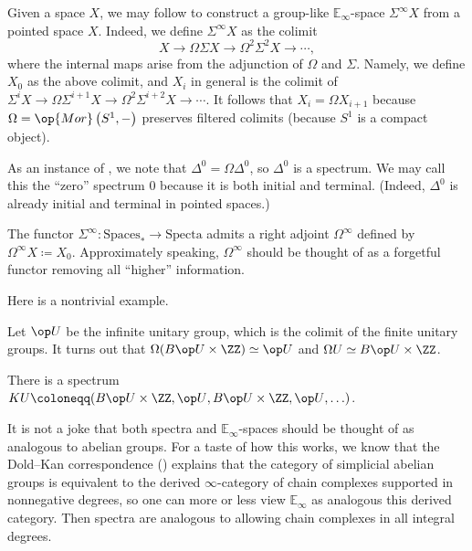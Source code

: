 \documentclass[../notes.tex]{subfiles}
\begin{document}
\begin{example} \label{ex:space-to-spec}
	Given a space $X$, we may follow  to construct a group-like $\mathbb E_\infty$-space $\Sigma^\infty X$ from a pointed space $X$. Indeed, we define $\Sigma^\infty X$ as the colimit
	\[X\to\Omega\Sigma X\to\Omega^2\Sigma^2X\to\cdots,\]
	where the internal maps arise from the adjunction of $\Omega$ and $\Sigma$. Namely, we define $X_0$ as the above colimit, and $X_i$ in general is the colimit of $\Sigma^iX\to\Omega\Sigma^{i+1}X\to\Omega^2\Sigma^{i+2}X\to\cdots$. It follows that $X_i=\Omega X_{i+1}$ because $\Omega=\op{Mor}\left(S^1,-\right)$ preserves filtered colimits (because $S^1$ is a compact object).
\end{example}
\begin{example}
	As an instance of , we note that $\Delta^0=\Omega\Delta^0$, so $\Delta^0$ is a spectrum. We may call this the ``zero'' spectrum $0$ because it is both initial and terminal. (Indeed, $\Delta^0$ is already initial and terminal in pointed spaces.)
\end{example}
\begin{remark}
	The functor $\Sigma^\infty\colon\mathrm{Spaces}_*\to\mathrm{Specta}$ admits a right adjoint $\Omega^\infty$ defined by $\Omega^\infty X\coloneqq X_0$. Approximately speaking, $\Omega^\infty$ should be thought of as a forgetful functor removing all ``higher'' information.
\end{remark}
Here is a nontrivial example.
\begin{theorem} \label{thm:bott-periodicity}
	Let $\op U$ be the infinite unitary group, which is the colimit of the finite unitary groups. It turns out that $\Omega(B{\op U}\times\ZZ)\simeq\op U$ and $\Omega U\simeq B\op U\times\ZZ$.
\end{theorem}
\begin{example}
	There is a spectrum $KU\coloneqq(B{\op U}\times\ZZ,{\op U},B{\op U}\times\ZZ,{\op U},\ldots)$.
\end{example}
\begin{remark}
	It is not a joke that both spectra and $\mathbb E_\infty$-spaces should be thought of as analogous to abelian groups. For a taste of how this works, we know that the Dold--Kan correspondence () explains that the category of simplicial abelian groups is equivalent to the derived $\infty$-category of chain complexes supported in nonnegative degrees, so one can more or less view $\mathbb E_\infty$ as analogous this derived category. Then spectra are analogous to allowing chain complexes in all integral degrees.
\end{remark}
\end{document}
